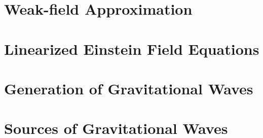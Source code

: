 \chapter{Weak-field Approximation}\label{ch:weak-field-approximation}



\chapter{Linearized Einstein Field Equations}\label{ch:linearized-einstein-field-equations}


\chapter{Generation of Gravitational Waves}\label{ch:generation-of-gravitational-waves}


\chapter{Sources of Gravitational Waves}\label{ch:sources-of-gravitational-waves}


